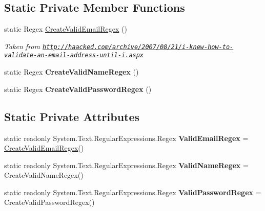 \subsection*{Static Private Member Functions}
\begin{DoxyCompactItemize}
\item 
static Regex \hyperlink{class_ramboell_1_1i_o_s_1_1_validator_a6e258a73cdcd1a90685fc026e7e92ff3}{Create\+Valid\+Email\+Regex} ()
\begin{DoxyCompactList}\small\item\em Taken from \href{http://haacked.com/archive/2007/08/21/i-knew-how-to-validate-an-email-address-until-i.aspx}{\tt http\+://haacked.\+com/archive/2007/08/21/i-\/knew-\/how-\/to-\/validate-\/an-\/email-\/address-\/until-\/i.\+aspx} \end{DoxyCompactList}\item 
\mbox{\label{class_ramboell_1_1i_o_s_1_1_validator_a93026ab8f508ce6cb3e8b666b1c4b1ce}} 
static Regex {\bfseries Create\+Valid\+Name\+Regex} ()
\item 
\mbox{\label{class_ramboell_1_1i_o_s_1_1_validator_abec24ab9e7a001acd05cc37a9ffdb26b}} 
static Regex {\bfseries Create\+Valid\+Password\+Regex} ()
\end{DoxyCompactItemize}
\subsection*{Static Private Attributes}
\begin{DoxyCompactItemize}
\item 
\mbox{\label{class_ramboell_1_1i_o_s_1_1_validator_a5e438b906572b3a481a1a6e983e9602f}} 
static readonly System.\+Text.\+Regular\+Expressions.\+Regex {\bfseries Valid\+Email\+Regex} = \hyperlink{class_ramboell_1_1i_o_s_1_1_validator_a6e258a73cdcd1a90685fc026e7e92ff3}{Create\+Valid\+Email\+Regex}()
\item 
\mbox{\label{class_ramboell_1_1i_o_s_1_1_validator_a40ce762de26bb0607852bb2af896c75f}} 
static readonly System.\+Text.\+Regular\+Expressions.\+Regex {\bfseries Valid\+Name\+Regex} = Create\+Valid\+Name\+Regex()
\item 
\mbox{\label{class_ramboell_1_1i_o_s_1_1_validator_ad7f61c9214d32c8c260354f6979edc58}} 
static readonly System.\+Text.\+Regular\+Expressions.\+Regex {\bfseries Valid\+Password\+Regex} = Create\+Valid\+Password\+Regex()
\end{DoxyCompactItemize}


